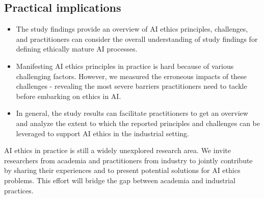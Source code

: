 \subsection{Practical implications}
\begin{itemize}
    \item The study findings provide an overview of AI ethics principles, challenges, and practitioners can consider the overall understanding of study findings for defining ethically mature AI processes.
    \item Manifesting AI ethics principles in practice is hard because of various challenging factors. However, we measured the erroneous impacts of these challenges - revealing the most severe barriers practitioners need to tackle before embarking on ethics in AI. 
    \item In general, the study results can facilitate practitioners to get an overview and analyze the extent to which the reported principles and challenges can be leveraged to support AI ethics in the industrial setting.
 \end{itemize}
   
AI ethics in practice is still a widely unexplored research area. We invite researchers from academia and practitioners from industry to jointly contribute by sharing their experiences and to present potential solutions for AI ethics problems. This effort will bridge the gap between academia and industrial practices.  

